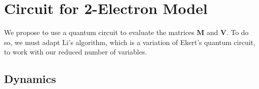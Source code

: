 \documentclass{aux/ttuthes2007}
\begin{document}

\section {\textbf{Circuit for 2-Electron Model}}

We propose to use a quantum circuit to evaluate the matrices $\bm M$ and $\bm V$. To do so, we must adapt Li's  algorithm, which is a variation of Ekert's  quantum circuit, to work with our reduced number of variables.
%
\subsection {\textbf{Dynamics}}
\end{document}
